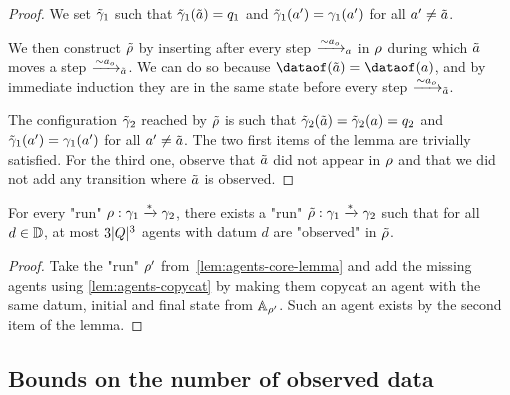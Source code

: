 \begin{proof}
	We set $\Tilde{\config}_1$ such that $\Tilde{\config}_1(\Tilde{a}) = q_1$ and $\Tilde{\config}_1(a') = \config_1(a')$ for all $a' \neq \Tilde{a}$.
	
	We then construct $\Tilde{\run}$ by inserting after every step $\step{\sim}{a}{a_o}$ in $\run$ during which $\Tilde{a}$ moves a step
	$\step{\sim}{\Tilde{a}}{a_o}$.
	We can do so because $\dataof(\Tilde{a})=\dataof(a)$, and by immediate induction they are in the same state before every step $\step{\sim}{\Tilde{a}}{a_o}$.
	
	The configuration $\Tilde{\config}_2$ reached by $\Tilde{\run}$ is such that $\Tilde{\config}_2(\Tilde{a}) = \Tilde{\config}_2(a) = q_2$ and $\Tilde{\config}_1(a') = \config_1(a')$ for all $a' \neq \Tilde{a}$. The two first items of the lemma are trivially satisfied.
	For the third one, observe that $\Tilde{a}$ did not appear in $\run$ and that we did not add any transition where $\Tilde{a}$ is observed.
\end{proof}


\begin{corollary}
	For every "run" $\run : \config_1 \xrightarrow{*} \config_2$, there exists a "run" $\Tilde{\run} : \config_1 \xrightarrow{*} \config_2$ such that for all $d \in \Dataset$, at most $3\size{Q}^3$ agents with datum $d$ are "observed" in $\Tilde{\run}$.
\end{corollary}

\begin{proof}
	Take the "run" $\run'$ from~\cref{lem:agents-core-lemma} and add the missing agents using \cref{lem:agents-copycat} by making them copycat an agent with the same datum, initial and final state from $\Agentset_{\run'}$. Such an agent exists by the second item of the lemma.
\end{proof}

\subsection{Bounds on the number of observed data}

